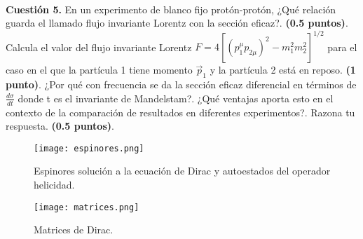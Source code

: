 \documentclass[paper=a4, fontsize=11pt]{scrartcl} %
\numberwithin{equation}{section} %
\numberwithin{figure}{section} %
\numberwithin{table}{section} %
\begin{document}
\\
\textbf{Cuestión 5.} En un experimento de blanco fijo protón-protón, ¿Qué relación guarda el llamado flujo invariante Lorentz con la sección eficaz?. \textbf{(0.5 puntos)}. Calcula el valor del flujo invariante Lorentz
$F=4[(p^\mu_1p_{2\mu})^2 - m_1^2 m_2^2]^{1/2}$ para el caso en el que la partícula 1 tiene momento $\vec{p}_1$ y la partícula 2 está en reposo. \textbf{(1 punto)}. ¿Por qué
con frecuencia se da la sección eficaz diferencial en términos de $\frac{d\sigma}{dt}$ donde t es el invariante de Mandelstam?. ¿Qué ventajas aporta esto en el contexto
de la comparación de resultados en diferentes experimentos?. Razona tu respuesta. \textbf{(0.5 puntos)}. 
  
\vspace{3cm}

\begin{figure}[!h]
\begin{center}
\texttt{[image: espinores.png]}
\end{center}
\caption{Espinores solución a la ecuación de Dirac y autoestados del operador helicidad.}
\label{espinores}
\end{figure}


\begin{figure}[!h]
\begin{center}
\texttt{[image: matrices.png]}
\end{center}
\caption{Matrices de Dirac.}
\label{matrices}
\end{figure}
\end{document}
